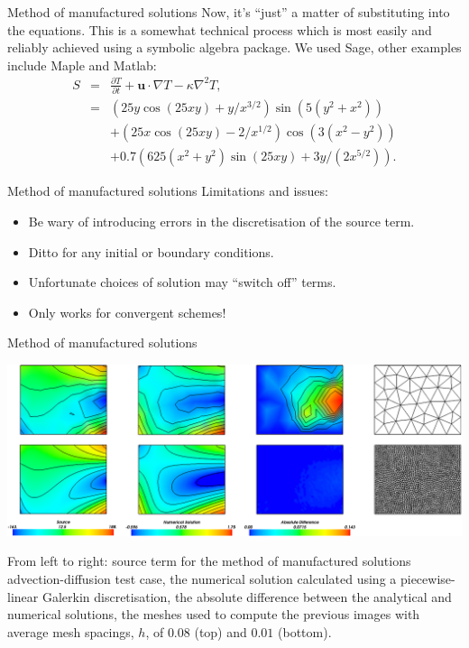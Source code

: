 \documentclass[t]{beamer}
\begin{document}
\begin{frame}{Method of manufactured solutions}
  Now, it's ``just'' a matter of substituting into the equations. This is a
  somewhat technical process which is most easily and reliably achieved
  using a symbolic algebra package. We used Sage, other examples include
  Maple and Matlab:
  \begin{eqnarray*} S &=& \frac{\partial T}{\partial t} + \mathbf{u}\cdot
    \nabla T - \kappa\nabla^2 T\textrm{,} \\ 
    &=& \left(25y\cos(25xy) + y/x^{3/2}\right)\sin\left(5(y^2 +
      x^2)\right)\\ 
    &&+ \left(25x\cos(25xy) - 2/x^{1/2}\right)\cos\left(3(x^2 - y^2)\right)
    \\ 
    &&+ 0.7\left(625(x^2+y^2)\sin(25xy) + 3y/(2x^{5/2})\right)\textrm{.}
  \end{eqnarray*}
\end{frame}

\begin{frame}{Method of manufactured solutions}
  Limitations and issues:
  \begin{itemize}
  \item Be wary of introducing errors in the discretisation of the source
    term.
  \item Ditto for any initial or boundary conditions.
  \item Unfortunate choices of solution may ``switch off'' terms.
  \item Only works for convergent schemes!
  \end{itemize}
  
\end{frame}

\begin{frame}{Method of manufactured solutions}

  \begin{center}
    \includegraphics[width=\textwidth]{MMS}     
  \end{center}

{\tiny From left to right: source term for
the method of manufactured solutions advection-diffusion test case, the numerical solution calculated using a piecewise-linear
Galerkin discretisation, the absolute difference between the analytical and numerical solutions, the meshes used to compute the
previous images with average mesh spacings, $h$, of $0.08$ (top) and $0.01$ (bottom).}

\end{frame}
\end{document}

